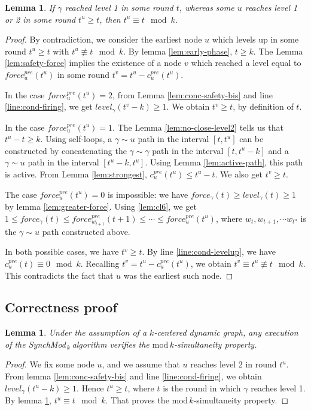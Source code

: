 \documentclass[11pt,letterpaper]{article}
\newtheorem{lem}[thm]{Lemma}
\newcommand{\cent}{\gamma}
\newcommand{\SM}{{\em SynchMod}$_{\,k}\ $}
\begin{document}
\begin{lem} \label{lem:later-level1}
	If $\cent$ reached level 1 in some round $t$, whereas some $u$ reaches level 1 or 2 in some round $t^u \geq t$, then $t^u \equiv t \mod k$. 
\end{lem}
\begin{proof}
	By contradiction, we consider the earliest node $u$ which levels up in some round $t^u \geq t$ with $t^u \not\equiv t \mod k$.
	By lemma \ref{lem:early-phase}, $t \geq k$.
	The Lemma \ref{lem:safety-force} implies the existence of a node $v$ which reached a level equal to $force_u^{pre}(t^u)$ in some round $t^v = t^u-c_u^{pre}(t^u)$. 

	In the case $force_u^{pre}(t^u) = 2$, from Lemma \ref{lem:conc-safety-bis} and line \ref{line:cond-firing}, we get $level_\cent(t^v-k) \geq 1$. We obtain $t^v \geq t$, by definition of $t$.

	In the case $force_u^{pre}(t^u) = 1$.
	The Lemma \ref{lem:no-close-level2} tells us that $t^u-t \geq k$.
	Using self-loops, a $\cent \sim u$ path in the interval $[t,t^u]$ can be constructed by concatenating the $\cent \sim \cent$ path in the interval $[t,t^u-k]$
	and a $\cent \sim u$ path in the interval $[t^u-k,t^u]$.
	Using Lemma \ref{lem:active-path}, this path is active.
	From Lemma \ref{lem:strongest}, $c_u^{pre}(t^u) \leq t^u-t$.
	We also get $t^v \geq t$.

	The case $force_u^{pre}(t^u) = 0$ is impossible: we have $force_\cent(t) \geq level_\cent(t) \geq 1$ by lemma \ref{lem:greater-force}.
	Using \ref{lem:cl6}, we get $1 \leq force_\cent(t) \leq force_{w_{t+1}}^{pre}(t+1) \leq \cdots \leq force_u^{pre}(t^u)$,
	where $w_t, w_{t+1}, \cdots w_{t^u}$ is the $\cent \sim u$ path constructed above.

	In both possible cases, we have $t^v \geq t$.
	By line \ref{line:cond-levelup}, we have $c_u^{pre}(t) \equiv 0 \mod k$.
	Recalling $t^v = t^u-c_u^{pre}(t^u)$, we obtain $t^v \equiv t^u \not\equiv t \mod k$.
	This contradicts the fact that $u$ was the earliest such node.
\end{proof}

\subsection{Correctness proof}

\begin{lem} \label{lem:safety} 
	Under the assumption of a $k$-centered dynamic graph, 
	any execution of the \SM algorithm verifies the $\mathrm{mod}\,k$-simultaneity property.
\end{lem}
\begin{proof}
	We fix some node $u$, and we assume that $u$ reaches level 2 in round $t^u$.
	From lemma \ref{lem:conc-safety-bis} and line \ref{line:cond-firing}, we obtain $level_\cent(t^u-k) \geq 1$.
	Hence $t^u \geq t$, where $t$ is the round in which $\cent$ reaches level 1.
	By lemma \ref{lem:later-level1}, $t^u \equiv t \mod k$.
	That proves the $\mathrm{mod}\,k$-simultaneity property.
\end{proof}
\end{document}
